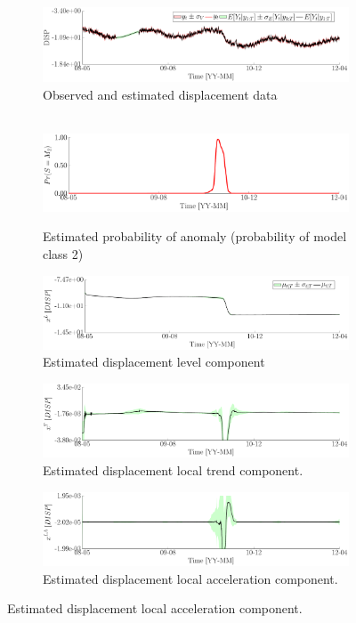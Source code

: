 \begin{figure}[h!]
\centering
\begin{subfigure}{\linewidth}\centering
\includegraphics[width=0.9\linewidth]{./docfigs/Example_DISPSIM_ANOMALY/optim_param_optim_initialhiddenstate/DISP_ObservedPredicted.pdf}
\caption{Observed and estimated displacement data}
\end{subfigure}
\begin{subfigure}{\linewidth}\centering
\quad~~\includegraphics[width=0.85\linewidth]{./docfigs/Example_DISPSIM_ANOMALY/optim_param_optim_initialhiddenstate/ModelProbability.pdf} 
\caption{Estimated probability of anomaly (probability of model class 2)}
\end{subfigure}
\begin{subfigure}{\linewidth}\centering
\includegraphics[width=0.9\linewidth]{./docfigs/Example_DISPSIM_ANOMALY/optim_param_optim_initialhiddenstate/DISP_L_1.pdf} 
\caption{Estimated displacement level component}
\end{subfigure}
\begin{subfigure}{\linewidth}\centering
\includegraphics[width=0.9\linewidth]{./docfigs/Example_DISPSIM_ANOMALY/optim_param_optim_initialhiddenstate/DISP_T_2.pdf}
\caption{Estimated displacement local trend component.}
\end{subfigure}
\begin{subfigure}{\linewidth}\centering
\includegraphics[width=0.9\linewidth]{./docfigs/Example_DISPSIM_ANOMALY/optim_param_optim_initialhiddenstate/DISP_LA_3.pdf}
\caption{Estimated displacement local acceleration component.}
\end{subfigure}
\end{figure}
